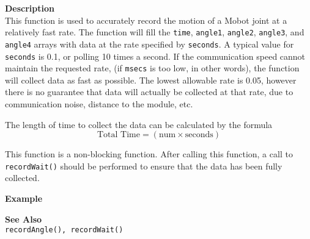 \noindent
{\bf Description}\\
This function is used to accurately record the motion of a Mobot joint at a relatively fast
rate. The function will fill the \texttt{time}, \texttt{angle1},
\texttt{angle2}, \texttt{angle3}, and \texttt{angle4} arrays with data
at the rate specified by \texttt{seconds}. A typical value for \texttt{seconds} is 0.1, or
polling 10 times a second. If the communication speed cannot maintain 
the requested rate, (if \texttt{msecs} is too low, in other words), the function will
collect data as fast as possible. The lowest allowable rate is 0.05, however there is
no guarantee that data will actually be collected at that rate, due to communication noise,
distance to the module, etc.

The length of time to collect the data can be calculated by the formula \\
\begin{equation*}
\text{Total Time} = (\text{num} \times \text{seconds}) 
\end{equation*}

This function is a non-blocking function. After calling this function, a call to
\texttt{recordWait()} should be performed to ensure that the data has been fully collected.

\noindent
{\bf Example}\\
\noindent

\noindent
{\bf See Also}\\
\texttt{recordAngle(), recordWait()}\\

